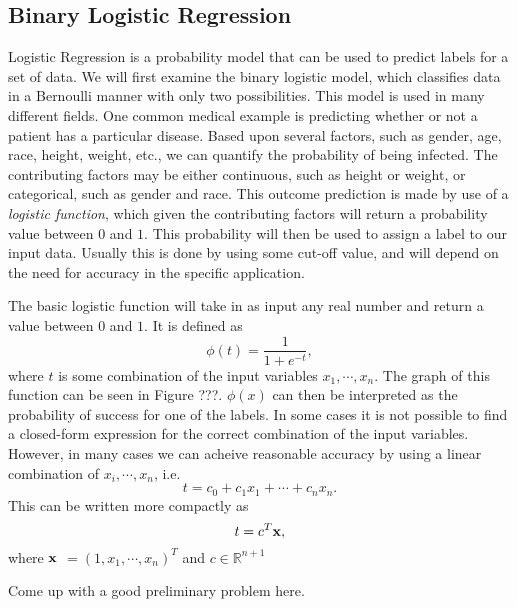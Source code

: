 
\subsection*{Binary Logistic Regression}
Logistic Regression is a probability model that can be used to predict labels for a set of data.  We will first examine the binary logistic model, which classifies data in a Bernoulli manner with only two possibilities.  This model is used in many different fields.  One common medical example is predicting whether or not a patient has a particular disease.  Based upon several factors, such as gender, age, race, height, weight, etc., we can quantify the probability of being infected.  The contributing factors may be either continuous, such as height or weight, or categorical, such as gender and race.  This outcome prediction is made by use of a \emph{logistic function}, which given the contributing factors will return a probability value between $0$ and $1$.  This probability will then be used to assign a label to our input data.  Usually this is done by using some cut-off value, and will depend on the need for accuracy in the specific application.

The basic logistic function will take in as input any real number and return a value between $0$ and $1$.  It is defined as
\begin{equation}
\phi(t) = \frac{1}{1 + e^{-t}},
\end{equation}
where $t$ is some combination of the input variables $x_1, \cdots, x_n$.  The graph of this function can be seen in Figure ???.   $\phi(x)$ can then be interpreted as the probability of success for one of the labels.  In some cases it is not possible to find a closed-form expression for the correct combination of the input variables.  However, in many cases we can acheive reasonable accuracy by using a linear combination of $x_i, \cdots, x_n$, i.e.
\begin{equation*}
t = c_0 + c_1 x_1 + \cdots + c_n x_n.
\end{equation*}
This can be written more compactly as
\begin{equation*}
t = c^{T}\bf{x},
\end{equation*}
where $\bf{x}$ $= (1, x_1, \cdots , x_n)^{T}$ and $c \in \mathbb{R}^{n+1}$ 

\begin{problem}
Come up with a good preliminary problem here.
\end{problem}

